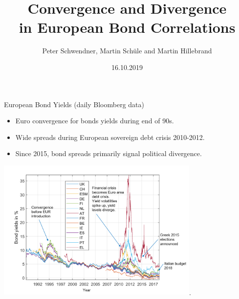 \documentclass{beamer}
\title[Your Short Title]{Convergence and Divergence\\ in European Bond Correlations}
\author{Peter Schwendner, Martin Schüle and Martin Hillebrand}
\institute{Zurich University of Applied Sciences}
\date{16.10.2019}
\begin{document}
\begin{frame}
  \titlepage
\end{frame}




\begin{frame}{European Bond Yields (daily Bloomberg data)}
\begin{itemize}
	\item Euro convergence for bonds yields during end of 90s.
	\item Wide spreads during European sovereign debt crisis 2010-2012.
	\item Since 2015, bond spreads primarily signal political divergence. 
\end{itemize}

\includegraphics[height=7cm]{yields}.

\end{frame}
\end{document}

